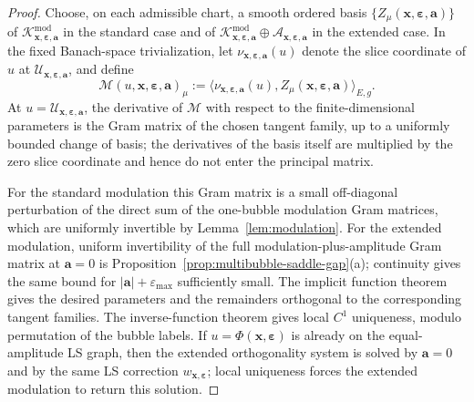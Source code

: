 \documentclass[11pt,reqno,a4paper]{amsart}
\numberwithin{equation}{section}
\theoremstyle{plain}
\theoremstyle{remark}
\theoremstyle{plain}
\begin{document}
\begin{proof}
Choose, on each admissible chart, a smooth ordered basis
$\{Z_\mu(\mathbf x,\boldsymbol\varepsilon,\mathbf a)\}$ of
$\mathcal K^{\mathrm{mod}}_{\mathbf x,\boldsymbol\varepsilon,\mathbf a}$ in the standard case and of
$\mathcal K^{\mathrm{mod}}_{\mathbf x,\boldsymbol\varepsilon,\mathbf a}\oplus
\mathcal A_{\mathbf x,\boldsymbol\varepsilon,\mathbf a}$ in the extended case.  In the fixed Banach-space
trivialization, let
$\nu_{\mathbf x,\boldsymbol\varepsilon,\mathbf a}(u)$ denote the slice coordinate of $u$ at
$\mathcal U_{\mathbf x,\boldsymbol\varepsilon,\mathbf a}$, and define
\[
\mathcal M(u,\mathbf x,\boldsymbol\varepsilon,\mathbf a)_\mu
:=
\big\langle
\nu_{\mathbf x,\boldsymbol\varepsilon,\mathbf a}(u),
Z_\mu(\mathbf x,\boldsymbol\varepsilon,\mathbf a)
\big\rangle_{E,g}.
\]
At $u=\mathcal U_{\mathbf x,\boldsymbol\varepsilon,\mathbf a}$, the derivative of $\mathcal M$ with respect to the
finite-dimensional parameters is the Gram matrix of the chosen tangent family, up to a uniformly bounded
change of basis; the derivatives of the basis itself are multiplied by the zero slice coordinate and hence do
not enter the principal matrix.

For the standard modulation this Gram matrix is a small off-diagonal perturbation of the direct sum of the
one-bubble modulation Gram matrices, which are uniformly invertible by Lemma~\ref{lem:modulation}.  For the
extended modulation, uniform invertibility of the full modulation-plus-amplitude Gram matrix at
$\mathbf a=0$ is Proposition~\ref{prop:multibubble-saddle-gap}\textup{(a)}; continuity gives the same bound for
$|\mathbf a|+\varepsilon_{\max}$ sufficiently small.  The implicit function theorem gives the desired
parameters and the remainders orthogonal to the corresponding tangent families.  The inverse-function theorem
gives local $C^1$ uniqueness, modulo permutation of the bubble labels.  If
$u=\Phi(\mathbf x,\boldsymbol\varepsilon)$ is already on the equal-amplitude LS graph, then the extended
orthogonality system is solved by $\mathbf a=0$ and by the same LS correction
$w_{\mathbf x,\boldsymbol\varepsilon}$; local uniqueness forces the extended modulation to return this solution.
\end{proof}
\end{document}
